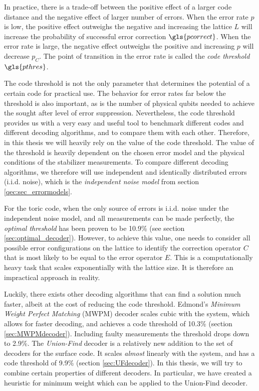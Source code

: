 In practice, there is a trade-off between the positive effect of a larger code distance and the negative effect of larger number of errors. When the error rate $p$ is low, the positive effect outweighs the negative and increasing the lattice $L$ will increase the probability of successful error correction $\gls{pcorrect}$. When the error rate is large, the negative effect outweighs the positive and increasing $p$ will decrease $p_C$. The point of transition in the error rate is called the \emph{code threshold} $\gls{pthres}$.

The code threshold is not the only parameter that determines the potential of a certain code for practical use. The behavior for error rates far below the threshold is also important, as is the number of physical qubits needed to achieve the sought after level of error suppression. Nevertheless, the code threshold provides us with a very easy and useful tool to benchmark different codes and different decoding algorithms, and to compare them with each other. Therefore, in this thesis we will heavily rely on the value of the code threshold. The value of the threshold is heavily dependent on the chosen error model and the physical conditions of the stabilizer measurements. To compare different decoding algorithms, we therefore will use independent and identically distributed errors (i.i.d. noise), which is the \emph{independent noise model} from section \ref{qec:sec_errormodels}.

For the toric code, when the only source of errors is i.i.d. noise under the independent noise model, and all measurements can be made perfectly, the \emph{optimal threshold} has been proven to be 10.9\% (see section \ref{sec:optimal_decoder}). However, to achieve this value, one needs to consider all possible error configurations on the lattice to identify the correction operator $C$ that is most likely to be equal to the error operator $E$. This is a computationally heavy task that scales exponentially with the lattice size. It is therefore an impractical approach in reality.

Luckily, there exists other decoding algorithms that can find a solution much faster, albeit at the cost of reducing the code threshold. Edmond's \emph{Minimum Weight Perfect Matching} (MWPM) decoder scales cubic with the system, which allows for faster decoding, and achieves a code threshold of 10.3\% (section \ref{sec:MWPMdecoder}). Including faulty measurements the threshold drops down to 2.9\%. The \emph{Union-Find} decoder is a relatively new addition to the set of decoders for the surface code. It scales \emph{almost} linearly with the system, and has a code threshold of 9.9\% (section \ref{sec:UFdecoder}). In this thesis, we will try to combine certain properties of different decoders. In particular, we have created a heuristic for minimum weight which can be applied to the Union-Find decoder.

